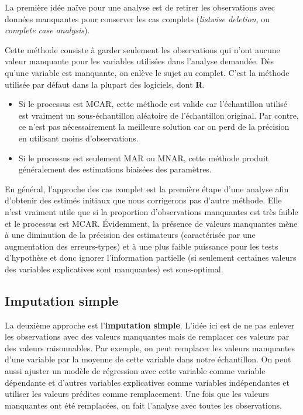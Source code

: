 \documentclass[
  11pt,
  letterpaper,
]{book}
\providecommand{\tightlist}{%
  \setlength{\itemsep}{0pt}\setlength{\parskip}{0pt}}\usepackage{longtable,booktabs,array}
\theoremstyle{definition}
\theoremstyle{remark}
\begin{document}
La première idée naïve pour une analyse est de retirer les observations
avec données manquantes pour conserver les cas complets (\emph{listwise
deletion}, ou \emph{complete case analysis}).

Cette méthode consiste à garder seulement les observations qui n'ont
aucune valeur manquante pour les variables utilisées dans l'analyse
demandée. Dès qu'une variable est manquante, on enlève le sujet au
complet. C'est la méthode utilisée par défaut dans la plupart des
logiciels, dont \textbf{R}.

\begin{itemize}
\tightlist
\item
  Si le processus est MCAR, cette méthode est valide car l'échantillon
  utilisé est vraiment un sous-échantillon aléatoire de l'échantillon
  original. Par contre, ce n'est pas nécessairement la meilleure
  solution car on perd de la précision en utilisant moins
  d'observations.
\item
  Si le processus est seulement MAR ou MNAR, cette méthode produit
  généralement des estimations biaisées des paramètres.
\end{itemize}

En général, l'approche des cas complet est la première étape d'une
analyse afin d'obtenir des estimés initiaux que nous corrigerons pas
d'autre méthode. Elle n'est vraiment utile que si la proportion
d'observations manquantes est très faible et le processus est MCAR.
Évidemment, la présence de valeurs manquantes mène à une diminution de
la précision des estimateurs (caractérisée par une augmentation des
erreurs-types) et à une plus faible puissance pour les tests d'hypothèse
et donc ignorer l'information partielle (si seulement certaines valeurs
des variables explicatives sont manquantes) est sous-optimal.

\hypertarget{imputation-simple}{%
\subsection{Imputation simple}\label{imputation-simple}}

La deuxième approche est l'\textbf{imputation simple}. L'idée ici est de
ne pas enlever les observations avec des valeurs manquantes mais de
remplacer ces valeurs par des valeurs raisonnables. Par exemple, on peut
remplacer les valeurs manquantes d'une variable par la moyenne de cette
variable dans notre échantillon. On peut aussi ajuster un modèle de
régression avec cette variable comme variable dépendante et d'autres
variables explicatives comme variables indépendantes et utiliser les
valeurs prédites comme remplacement. Une fois que les valeurs manquantes
ont été remplacées, on fait l'analyse avec toutes les observations.
\end{document}
